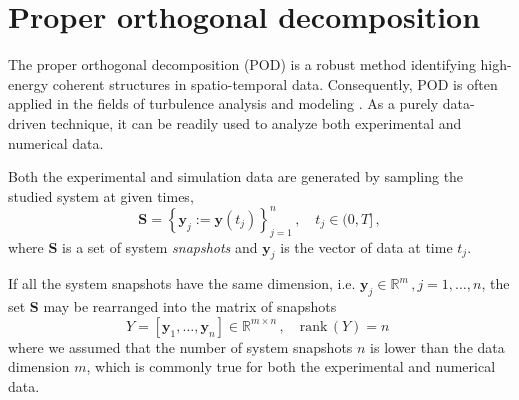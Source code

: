 \section{Proper orthogonal decomposition}
\label{sec:POD}

{The proper orthogonal decomposition (POD) is a robust method identifying high-energy coherent structures in spatio-temporal data. Consequently, POD is often applied in the fields of turbulence analysis \citep{uruba2020,taira2020} and modeling \citep{gatski1991,shinde2020}. As a purely data-driven technique, it can be readily used to analyze both experimental and numerical data.}




Both the experimental and simulation data are generated by sampling the studied system at given times,
\begin{equation}
\label{eq:snapshots}
    \bm{S} = \left\{\bm{y}_{j}:=\bm{y}(t_{j}) \right\}_{j=1}^{n}\,,\quad t_{j}\in (0,T]\,,
\end{equation}
where $\bm{S}$ is a set of system \textit{snapshots} and $\bm{y}_{j}$ is the vector of data at time $t_{j}$.

If all the system snapshots have the same dimension, i.e. $\bm{y}_{j}\in\mathbb{R}^{m}\,,j=1,\dots,n$, the set $\bm{S}$ may be rearranged into the matrix of snapshots
\begin{equation}
\label{eq:matrixOfSnapshots}
    Y = \left[\bm{y}_{1},\dots,\bm{y}_{n}\right] \in \mathbb{R}^{m\times n}\,,\quad \mathrm{rank}\,(Y) = n\,\,
\end{equation}
where we assumed that the number of system snapshots $n$ is lower than the data dimension $m$, which is commonly true for both the experimental and numerical data.


